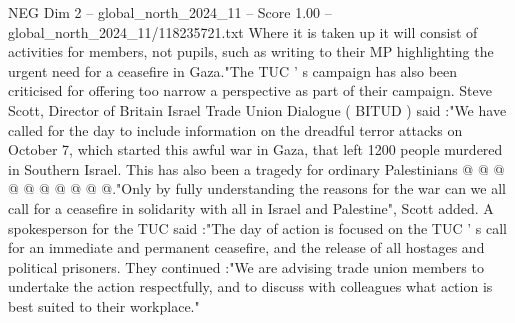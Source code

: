 \begin{textsample}{NEG Dim 2 – global\_north\_2024\_11 – Score 1.00 – global\_north\_2024\_11/118235721.txt}
Where it is taken up it will consist of activities for members, not pupils, such as writing to their MP highlighting the urgent need for a ceasefire in Gaza."The TUC ' s campaign has also been criticised for offering too narrow a perspective as part of their campaign.
Steve Scott, Director of Britain Israel Trade Union Dialogue ( BITUD ) said :"We have called for the day to include information on the dreadful terror attacks on October 7, which started this awful war in Gaza, that left 1200 people murdered in Southern Israel.
This has also been a tragedy for ordinary Palestinians @ @ @ @ @ @ @ @ @ @."Only by fully understanding the reasons for the war can we all call for a ceasefire in solidarity with all in Israel and Palestine", Scott added.
A spokesperson for the TUC said :"The day of action is focused on the TUC ' s call for an immediate and permanent ceasefire, and the release of all hostages and political prisoners.
They continued :"We are advising trade union members to undertake the action respectfully, and to discuss with colleagues what action is best suited to their workplace."

\end{textsample}
